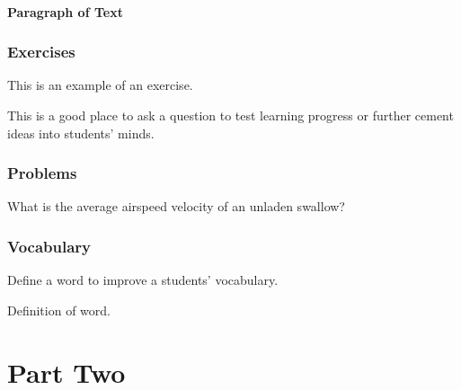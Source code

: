 \documentclass[11pt,fleqn]{book} %
\begin{document}
{\subsection{Paragraph of Text}

\begin{example}
\lipsum[2]
\end{example}


\section{Exercises}

This is an example of an exercise.

\begin{exercise}
This is a good place to ask a question to test learning progress or further cement ideas into students' minds.
\end{exercise}


\section{Problems}

\begin{problem}
What is the average airspeed velocity of an unladen swallow?
\end{problem}


\section{Vocabulary}

Define a word to improve a students' vocabulary.

\begin{vocabulary}[Word]
Definition of word.
\end{vocabulary}


\part{Part Two}

}
\end{document}
